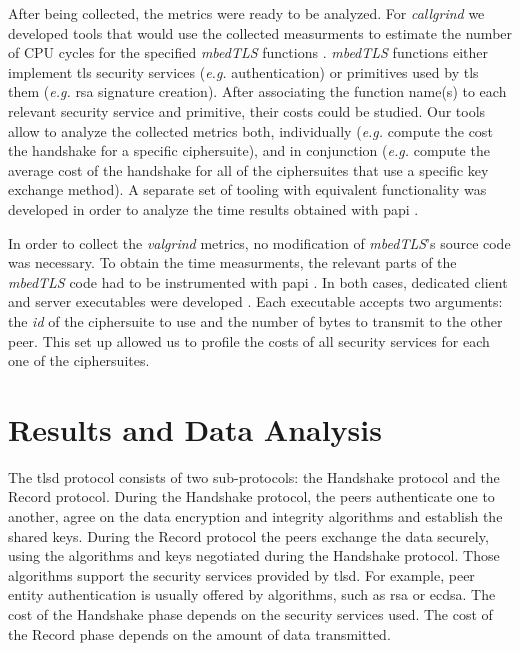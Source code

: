 After being collected, the metrics were ready to be analyzed. For \textit{callgrind} we developed tools that would use the collected 
measurments to estimate the number of CPU cycles for the specified \textit{mbedTLS} functions \cite{iluxonch23:online} \cite{iluxonch44:online}. 
\textit{mbedTLS} functions either implement \gls{tls} security services
(\textit{e.g.} authentication) or primitives used by \gls{tls} them (\textit{e.g.} \gls{rsa} signature creation).
After associating the function name(s) to each relevant security service and primitive, their costs could be studied. 
Our tools allow to analyze the collected metrics both, individually (\textit{e.g.} compute the cost the handshake for a specific ciphersuite), and in conjunction (\textit{e.g.}
compute the average cost of the handshake for all of the ciphersuites that use a specific key exchange method).
A separate set of tooling with equivalent functionality was developed in order to analyze the time results obtained with \gls{papi} \cite{iluxonch67:online}.

In order to collect the \textit{valgrind} metrics, no modification of \textit{mbedTLS}'s source code was necessary. To obtain the time measurments, the relevant
parts of the \textit{mbedTLS} code had to be instrumented with \gls{papi} \cite{iluxonch24:online}. In both cases, dedicated client and server
executables were developed \cite{iluxonch24:online}. Each executable accepts two arguments: the \textit{id} of the ciphersuite to use and the number of bytes to transmit to the other
peer. This set up allowed us to profile the costs of all security services for each one of the ciphersuites.
   \cite{iluxonch24:online}

\section{Results and Data Analysis}

The \gls{tlsd} protocol consists of two sub-protocols: the Handshake protocol and the Record protocol.
During the Handshake protocol, the peers authenticate one to another, agree on the data encryption and integrity
algorithms and establish the shared keys. During the Record protocol the peers exchange the data securely,
using the algorithms and keys negotiated during the Handshake protocol. Those algorithms support the security
services provided by \gls{tlsd}. For example, peer entity authentication is usually offered by algorithms, such
as \gls{rsa} or \gls{ecdsa}. The cost of the Handshake phase depends on the security services used. The cost
of the Record phase depends on the amount of data transmitted.


